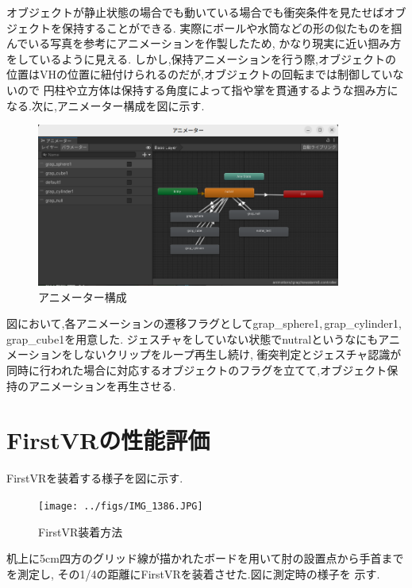 \documentclass{ltjsreport}
\begin{document}
		\vspace{-15pt}
		
		オブジェクトが静止状態の場合でも動いている場合でも衝突条件を見たせばオブジェクトを保持することができる.
		実際にボールや水筒などの形の似たものを掴んでいる写真を参考にアニメーションを作製したため,
		かなり現実に近い掴み方をしているように見える.
		しかし,保持アニメーションを行う際,オブジェクトの位置はVHの位置に紐付けられるのだが,オブジェクトの回転までは制御していないので
		円柱や立方体は保持する角度によって指や掌を貫通するような掴み方になる.次に,アニメーター構成を図に示す.

		\begin{figure}[H]
		\centering
		\includegraphics[width = 10cm]{../figs/Handanimater.png}
		\caption{アニメーター構成}
		\label{fig:Handanimater}
		\end{figure}
		\vspace{-15pt}

		図において,各アニメーションの遷移フラグとしてgrap\_sphere1,\,grap\_cylinder1,\,grap\_cube1を用意した.
		ジェスチャをしていない状態でnutralというなにもアニメーションをしないクリップをループ再生し続け,
		衝突判定とジェスチャ認識が同時に行われた場合に対応するオブジェクトのフラグを立てて,オブジェクト保持のアニメーションを再生させる.

	\section{FirstVRの性能評価}
		FirstVRを装着する様子を図に示す.
		\begin{figure}[H]
		\centering
		\texttt{[image: ../figs/IMG\_1386.JPG]}
		\caption{FirstVR装着方法}
		\label{fig:FirsrVRfit}
		\end{figure}
		\vspace{-15pt}
		机上に5cm四方のグリッド線が描かれたボードを用いて肘の設置点から手首までを測定し,
		その1/4の距離にFirstVRを装着させた.図に測定時の様子を
		示す.
\end{document}
